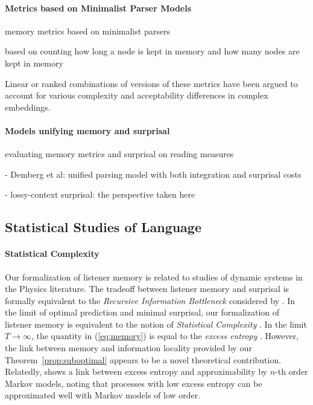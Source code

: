 \paragraph{Metrics based on Minimalist Parser Models}
memory metrics based on minimalist parsers

\cite{kobele2013memory}
\cite{graf2014evaluating}
\cite{GrafEtAl15MOL}
\cite{gerth2015memory}
\cite{GrafEtAl17JLM}
\cite{desanto2020parsing}
based on counting how long a node is kept in memory and how many nodes are kept in memory

Linear or ranked combinations of versions of these metrics have been argued to account for various complexity and acceptability differences in complex embeddings.

\paragraph{Models unifying memory and surprisal}


evaluating memory metrics and surprisal on reading measures \cite{boston2008parsing} \cite{demberg2008data} \cite{boston2011parallel}

- Demberg et al: unified parsing model with both integration and surprisal costs \cite{demberg2009computational,demberg2013incremental}

- lossy-context surprisal: the perspective taken here


\subsection{Statistical Studies of Language}

\paragraph{Statistical Complexity}
Our formalization of listener memory is related to studies of dynamic systems in the Physics literature.
The tradeoff between listener memory and surprisal is formally equivalent to the \emph{Recursive Information Bottleneck} considered by \cite{still-information-2014}.
In the limit of optimal prediction and minimal surprisal, our formalization of listener memory is equivalent to the notion of \emph{Statistical Complexity} \citep{crutchfield-inferring-1989}.
In the limit $T \rightarrow \infty$, the quantity in (\ref{eq:memory}) is equal to the \emph{excess entropy} \citep{crutchfield-inferring-1989}.
However, the link between memory and information locality provided by our Theorem~\ref{prop:suboptimal} appears to be a novel theoretical contribution.
Relatedly, \cite{sharan-prediction-2016} shows a link between excess entropy and approximability by $n$-th order Markov models, noting that processes with low excess entropy can be approximated well with Markov models of low order.


